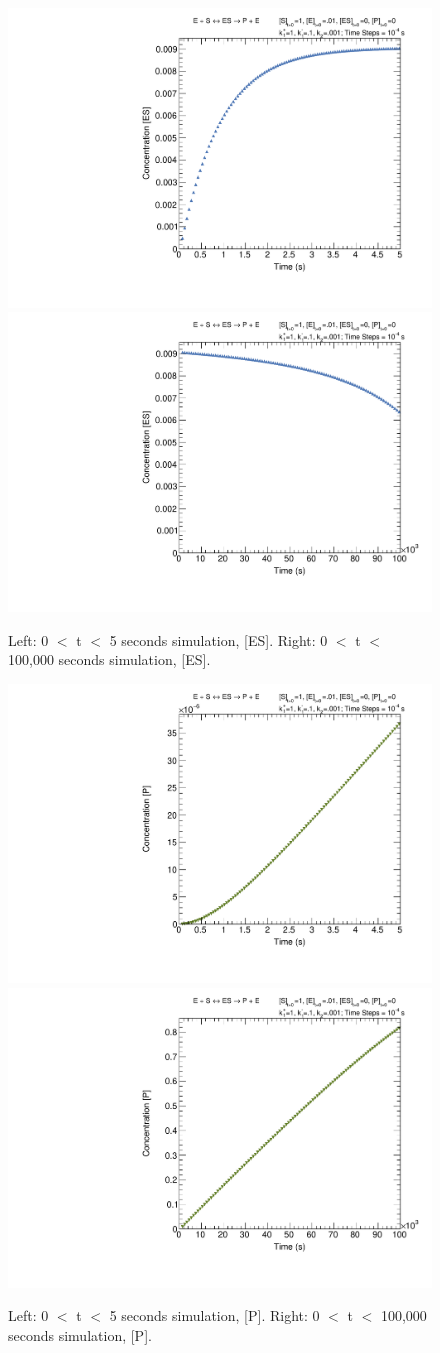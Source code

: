 \documentclass{article}
\begin{document}
\begin{figure}[H]
    \centering
    \includegraphics[width=.49\textwidth]{canv5_ES_c.pdf} 
    \includegraphics[width=.49\textwidth]{canv100k_ES_c.pdf}
    \caption{Left: 0 $<$ t $<$ 5 seconds simulation, [ES]. Right: 0 $<$ t $<$ 100,000 seconds simulation, [ES].}
    \label{}
\end{figure}

\begin{figure}[H]
    \centering
    \includegraphics[width=.49\textwidth]{canv5_P_c.pdf} 
    \includegraphics[width=.49\textwidth]{canv100k_P_c.pdf}
    \caption{Left: 0 $<$ t $<$ 5 seconds simulation, [P]. Right: 0 $<$ t $<$ 100,000 seconds simulation, [P].}
    \label{}
\end{figure}
\end{document}

